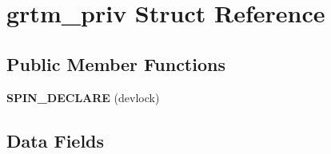 \hypertarget{structgrtm__priv}{}\section{grtm\+\_\+priv Struct Reference}
\label{structgrtm__priv}
\subsection*{Public Member Functions}
\begin{DoxyCompactItemize}
\item 
\mbox{\label{structgrtm__priv_ad5030f8b157b7c20ec5bc6c6dbcf6e5f}} 
{\bfseries S\+P\+I\+N\+\_\+\+D\+E\+C\+L\+A\+RE} (devlock)
\end{DoxyCompactItemize}
\subsection*{Data Fields}
